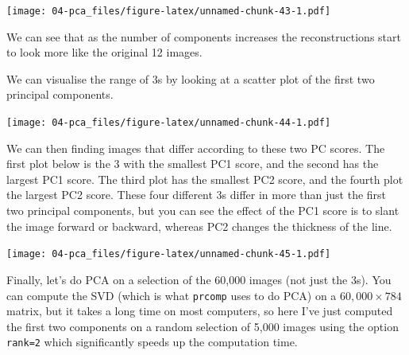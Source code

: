 \documentclass[]{book}
\newenvironment{Shaded}{\begin{snugshade}}{\end{snugshade}}
\newcommand{\CommentTok}[1]{\textcolor[rgb]{0.56,0.35,0.01}{\textit{#1}}}
\newcommand{\DecValTok}[1]{\textcolor[rgb]{0.00,0.00,0.81}{#1}}
\newcommand{\KeywordTok}[1]{\textcolor[rgb]{0.13,0.29,0.53}{\textbf{#1}}}
\newcommand{\NormalTok}[1]{#1}
\newcommand{\OperatorTok}[1]{\textcolor[rgb]{0.81,0.36,0.00}{\textbf{#1}}}
\newcommand{\StringTok}[1]{\textcolor[rgb]{0.31,0.60,0.02}{#1}}
\theoremstyle{definition}
\theoremstyle{definition}
\theoremstyle{definition}
\theoremstyle{remark}
\begin{document}
\texttt{[image: 04-pca\_files/figure-latex/unnamed-chunk-43-1.pdf]}

We can see that as the number of components increases the reconstructions start to look more like the original 12 images.

We can visualise the range of 3s by looking at a scatter plot of the first two principal components.

\begin{Shaded}
\end{Shaded}

\texttt{[image: 04-pca\_files/figure-latex/unnamed-chunk-44-1.pdf]}

We can then finding images that differ according to these two PC scores. The first plot below is the 3 with the smallest PC1 score, and the second has the largest PC1 score. The third plot has the smallest PC2 score, and the fourth plot the largest PC2 score.
These four different 3s differ in more than just the first two principal components, but you can see the effect of the PC1 score is to slant the image forward or backward, whereas PC2 changes the thickness of the line.

\begin{Shaded}
\end{Shaded}

\texttt{[image: 04-pca\_files/figure-latex/unnamed-chunk-45-1.pdf]}

Finally, let's do PCA on a selection of the 60,000 images (not just the 3s). You can compute the SVD (which is what \texttt{prcomp} uses to do PCA) on a \(60,000 \times 784\) matrix, but it takes a long time on most computers, so here I've just computed the first two components on a random selection of 5,000 images using the option \texttt{rank=2} which significantly speeds up the computation time.
\end{document}
